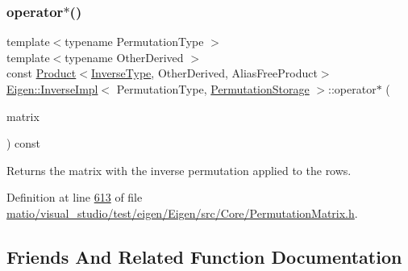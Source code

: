 \subsubsection{\texorpdfstring{operator$\ast$()}{operator*()}\hspace{0.1cm}{\footnotesize\ttfamily [2/2]}}
{\footnotesize\ttfamily template$<$typename Permutation\+Type $>$ \\
template$<$typename Other\+Derived $>$ \\
const \hyperlink{group___core___module_class_eigen_1_1_product}{Product}$<$\hyperlink{class_eigen_1_1_inverse}{Inverse\+Type}, Other\+Derived, Alias\+Free\+Product$>$ \hyperlink{class_eigen_1_1_inverse_impl}{Eigen\+::\+Inverse\+Impl}$<$ Permutation\+Type, \hyperlink{struct_eigen_1_1_permutation_storage}{Permutation\+Storage} $>$\+::operator$\ast$ (\begin{DoxyParamCaption}\item[{const \hyperlink{group___core___module_class_eigen_1_1_matrix_base}{Matrix\+Base}$<$ Other\+Derived $>$ \&}]{matrix }\end{DoxyParamCaption}) const\hspace{0.3cm}{\ttfamily [inline]}}

\begin{DoxyReturn}{Returns}
the matrix with the inverse permutation applied to the rows. 
\end{DoxyReturn}


Definition at line \hyperlink{matio_2visual__studio_2test_2eigen_2_eigen_2src_2_core_2_permutation_matrix_8h_source_l00613}{613} of file \hyperlink{matio_2visual__studio_2test_2eigen_2_eigen_2src_2_core_2_permutation_matrix_8h_source}{matio/visual\+\_\+studio/test/eigen/\+Eigen/src/\+Core/\+Permutation\+Matrix.\+h}.



\subsection{Friends And Related Function Documentation}
\mbox{\label{class_eigen_1_1_inverse_impl_3_01_permutation_type_00_01_permutation_storage_01_4_a1d5a5cf25a5052d1b8181587375c853b}} 
